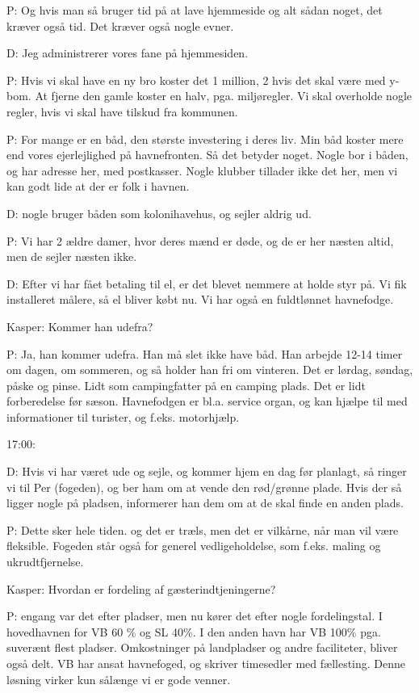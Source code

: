 P: Og hvis man så bruger tid på at lave hjemmeside og alt sådan noget, det kræver også tid. Det kræver også nogle evner.

D: Jeg administrerer vores fane på hjemmesiden.

P: Hvis vi skal have en ny bro koster det 1 million, 2 hvis det skal være med y-bom. At fjerne den gamle koster en halv, pga. miljøregler. Vi skal overholde nogle regler, hvis vi skal have tilskud fra kommunen.

P: For mange er en båd, den største investering i deres liv. Min båd koster mere end vores ejerlejlighed på havnefronten. Så det betyder noget. Nogle bor i båden, og har adresse her, med postkasser. Nogle klubber tillader ikke det her, men vi kan godt lide at der er folk i havnen.

D: nogle bruger båden som kolonihavehus, og sejler aldrig ud.

P: Vi har 2 ældre damer, hvor deres mænd er døde, og de er her næsten altid, men de sejler næsten ikke.


D: Efter vi har fået betaling til el, er det blevet nemmere at holde styr på. Vi fik installeret målere, så el bliver købt nu. Vi har også en fuldtlønnet havnefodge.

Kasper: Kommer han udefra?

P: Ja, han kommer udefra. Han må slet ikke have båd. Han arbejde 12-14 timer om dagen, om sommeren, og så holder han fri om vinteren. Det er lørdag, søndag, påske og pinse. Lidt som campingfatter på en camping plads. Det er lidt forberedelse før sæson. Havnefodgen er bl.a. service organ, og kan hjælpe til med informationer til turister, og f.eks. motorhjælp.

17:00:

D: Hvis vi har været ude og sejle, og kommer hjem en dag før planlagt, så ringer vi til Per (fogeden), og ber ham om at vende den rød/grønne plade. Hvis der så ligger nogle på pladsen, informerer han dem om at de skal finde en anden plads.

P: Dette sker hele tiden. og det er træls, men det er vilkårne, når man vil være fleksible. Fogeden står også for generel vedligeholdelse, som f.eks. maling og ukrudtfjernelse.


Kasper: Hvordan er fordeling af gæsterindtjeningerne?

P: engang var det efter pladser, men nu kører det efter nogle fordelingstal. I hovedhavnen for VB 60 \% og SL 40\%. I den anden havn har VB 100\% pga. suverænt flest pladser. Omkostninger på landpladser og andre faciliteter, bliver også delt. VB har ansat havnefoged, og skriver timesedler med fællesting. Denne løsning virker kun sålænge vi er gode venner.


